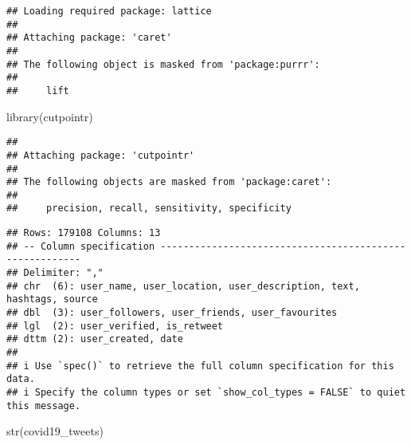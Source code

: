 \documentclass[
]{article}
\newenvironment{Shaded}{\begin{snugshade}}{\end{snugshade}}
\newcommand{\AttributeTok}[1]{\textcolor[rgb]{0.77,0.63,0.00}{#1}}
\newcommand{\ConstantTok}[1]{\textcolor[rgb]{0.00,0.00,0.00}{#1}}
\newcommand{\FunctionTok}[1]{\textcolor[rgb]{0.00,0.00,0.00}{#1}}
\newcommand{\NormalTok}[1]{#1}
\newcommand{\OtherTok}[1]{\textcolor[rgb]{0.56,0.35,0.01}{#1}}
\newcommand{\SpecialCharTok}[1]{\textcolor[rgb]{0.00,0.00,0.00}{#1}}
\newcommand{\StringTok}[1]{\textcolor[rgb]{0.31,0.60,0.02}{#1}}
\begin{document}
\begin{verbatim}
## Loading required package: lattice
## 
## Attaching package: 'caret'
## 
## The following object is masked from 'package:purrr':
## 
##     lift
\end{verbatim}

\begin{Shaded}
\begin{Highlighting}[]
\FunctionTok{library}\NormalTok{(cutpointr)}
\end{Highlighting}
\end{Shaded}

\begin{verbatim}
## 
## Attaching package: 'cutpointr'
## 
## The following objects are masked from 'package:caret':
## 
##     precision, recall, sensitivity, specificity
\end{verbatim}

\begin{Shaded}
\end{Shaded}

\begin{verbatim}
## Rows: 179108 Columns: 13
## -- Column specification --------------------------------------------------------
## Delimiter: ","
## chr  (6): user_name, user_location, user_description, text, hashtags, source
## dbl  (3): user_followers, user_friends, user_favourites
## lgl  (2): user_verified, is_retweet
## dttm (2): user_created, date
## 
## i Use `spec()` to retrieve the full column specification for this data.
## i Specify the column types or set `show_col_types = FALSE` to quiet this message.
\end{verbatim}

\begin{Shaded}
\begin{Highlighting}[]
\FunctionTok{str}\NormalTok{(covid19\_tweets)}
\end{Highlighting}
\end{Shaded}
\end{document}
